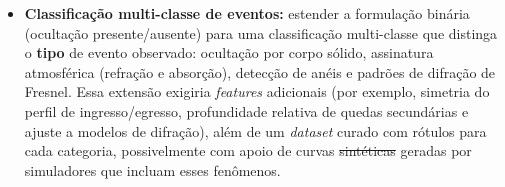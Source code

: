 \documentclass[msc]{on} %
\makeatletter
\providecommand{\DIFdeltex}[1]{{\protect\color{red}\sout{#1}}} %
\providecommand{\DIFdelbegin}{} %
\providecommand{\DIFdelend}{} %
\providecommand{\DIFdel}[1]{\texorpdfstring{\DIFdeltex{#1}}{}} %
\let\sout@orig\sout %
\renewcommand{\sout}[1]{\ifmmode\text{\sout@orig{\ensuremath{#1}}}\else\sout@orig{#1}\fi} %
\makeatother
\begin{document}
\begin{itemize}
	\item \textbf{Classificação multi-classe de eventos:} estender a formulação binária (ocultação presente/ausente) para uma classificação multi-classe que distinga o \textbf{tipo} de evento observado: ocultação por corpo sólido, assinatura atmosférica (refração e absorção), detecção de anéis e padrões de difração de Fresnel. Essa extensão exigiria \textit{features} adicionais (por exemplo, simetria do perfil de ingresso/egresso, profundidade relativa de quedas secundárias e ajuste a modelos de difração), além de um \textit{dataset} curado com rótulos para cada categoria, possivelmente com apoio de curvas \DIFdelbegin \DIFdel{sintéticas }\DIFdelend geradas por simuladores que incluam esses fenômenos.
\end{itemize}


\backmatter

%
%
\end{document}
